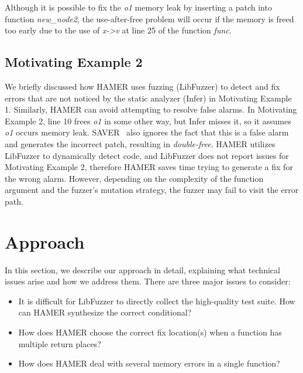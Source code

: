 \documentclass[a4paper,11pt,oneside,openany]{book}
\begin{document}
Although it is possible to fix the  {\it o1} memory leak by inserting a patch into function  {\it new\_node2}, the use-after-free problem will occur if the memory is freed too early due to the use of  {\it x->v} at line 25 of the function  {\it func}.




\section{Motivating Example 2}
We briefly discussed how HAMER uses fuzzing (LibFuzzer) to detect and fix errors that are not noticed by the static analyzer (Infer) in Motivating Example 1. Similarly, HAMER can avoid attempting to resolve false alarms. In Motivating Example 2, line 10 frees {\it o1} in some other way, but Infer misses it, so it assumes {\it o1} occurs memory leak. SAVER~\cite{SAVER} also ignores the fact that this is a false alarm and generates the incorrect patch, resulting in {\it double-free}. HAMER utilizes LibFuzzer to dynamically detect code, and LibFuzzer does not report issues for Motivating Example 2, therefore HAMER saves time trying to generate a fix for the wrong alarm. However, depending on the complexity of the function argument and the fuzzer's mutation strategy, the fuzzer may fail to visit the error path.


\chapter{Approach}
\label{approach}
In this section, we describe our approach in detail, explaining what technical issues arise and how we address them. There are three major issues to consider:
\begin{itemize}
\item It is difficult for LibFuzzer to directly collect the high-quality test suite. How can HAMER synthesize the correct conditional?
\item How does HAMER choose the correct fix location(s) when a function has multiple return places?
\item How does HAMER deal with several memory errors in a single function?
\end{itemize}
\end{document}
